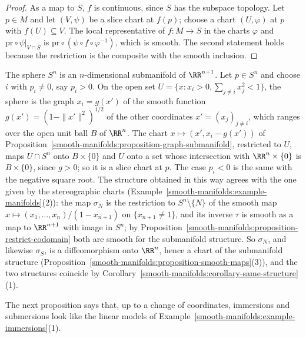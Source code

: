 \begin{proof}
As a map to $S$, $f$ is continuous, since $S$ has the subspace topology. Let $p \in M$ and let $(V, \psi)$ be a slice chart at $f(p)$; choose a chart
$(U, \varphi)$ at $p$ with $f(U) \subseteq V$. The local representative of $f \colon M \to S$ in the charts $\varphi$ and $\mathrm{pr} \circ \psi|_{V \cap S}$ is
$\mathrm{pr} \circ (\psi \circ f \circ \varphi^{-1})$, which is smooth. The second statement holds because the restriction is the composite with the smooth
inclusion.
\end{proof}

\begin{example}\label{smooth-manifolds:example-sphere-submanifold}
The sphere $S^n$ is an $n$-dimensional submanifold of $\RR^{n+1}$. Let $p \in S^n$ and choose $i$ with $p_i \neq 0$, say $p_i > 0$. On the open set
$U = \{x : x_i > 0, \sum_{j \neq i}x_j^2 < 1\}$, the sphere is the graph $x_i = g(x')$ of the smooth function $g(x') = (1 - \|x'\|^2)^{1/2}$ of the other
coordinates $x' = (x_j)_{j \neq i}$, which ranges over the open unit ball $B$ of $\RR^n$. The chart $x \mapsto (x', x_i - g(x'))$ of
Proposition~\ref{smooth-manifolds:proposition-graph-submanifold}, restricted to $U$, maps $U \cap S^n$ onto $B \times \{0\}$ and $U$ onto a set whose
intersection with $\RR^n \times \{0\}$ is $B \times \{0\}$, since $g > 0$; so it is a slice chart at $p$. The case $p_i < 0$ is the same with the negative
square root. The structure obtained in this way agrees with the one given by the stereographic charts
(Example~\ref{smooth-manifolds:example-manifolds}(2)): the map $\sigma_N$ is the restriction to $S^n \setminus \{N\}$ of the smooth map
$x \mapsto (x_1, \ldots, x_n)/(1 - x_{n+1})$ on $\{x_{n+1} \neq 1\}$, and its inverse $\tau$ is smooth as a map to $\RR^{n+1}$ with image in $S^n$; by
Proposition~\ref{smooth-manifolds:proposition-restrict-codomain} both are smooth for the submanifold structure. So $\sigma_N$, and likewise $\sigma_S$, is a
diffeomorphism onto $\RR^n$, hence a chart of the submanifold structure (Proposition~\ref{smooth-manifolds:proposition-smooth-maps}(3)), and the two structures
coincide by Corollary~\ref{smooth-manifolds:corollary-same-structure}(1).
\end{example}

The next proposition says that, up to a change of coordinates, immersions and submersions look like the linear models of
Example~\ref{smooth-manifolds:example-immersions}(1).

